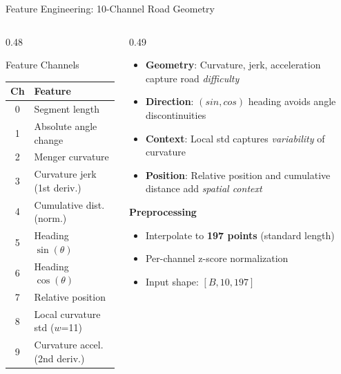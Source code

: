 \documentclass[aspectratio=169, 11pt]{beamer}
\begin{document}
\begin{frame}{Feature Engineering: 10-Channel Road Geometry}
\begin{columns}[T]
\begin{column}{0.48\textwidth}
  \begin{block}{Feature Channels}
    \centering
    \small
    \renewcommand{\arraystretch}{1.15}
    \begin{tabular}{cl}
      \toprule
      \textbf{Ch} & \textbf{Feature} \\
      \midrule
      0 & Segment length \\
      1 & Absolute angle change \\
      2 & Menger curvature \\
      3 & Curvature jerk (1st deriv.) \\
      4 & Cumulative dist. (norm.) \\
      5 & Heading $\sin(\theta)$ \\
      6 & Heading $\cos(\theta)$ \\
      7 & Relative position \\
      8 & Local curvature std ($w$=11) \\
      9 & Curvature accel. (2nd deriv.) \\
      \bottomrule
    \end{tabular}
  \end{block}
\end{column}
\begin{column}{0.49\textwidth}
    \begin{itemize}
      \item \textbf{Geometry}: Curvature, jerk, acceleration capture road \emph{difficulty}
      \item \textbf{Direction}: $(sin, cos)$ heading avoids angle discontinuities
      \item \textbf{Context}: Local std captures \emph{variability} of curvature
      \item \textbf{Position}: Relative position and cumulative distance add \emph{spatial context}
    \end{itemize}
  
  \vspace{0.3em}
  \textbf{Preprocessing}
  \begin{itemize}
    \item Interpolate to \textbf{197 points} (standard length)
    \item Per-channel z-score normalization
    \item Input shape: $[B, 10, 197]$
  \end{itemize}
\end{column}
\end{columns}
\end{frame}
\end{document}
